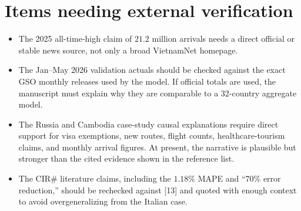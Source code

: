 \documentclass[11pt]{article}
\begin{document}
\section*{Items needing external verification}

\begin{itemize}
\item The 2025 all-time-high claim of \(21.2\) million arrivals needs a direct official or stable news source, not only a broad VietnamNet homepage.
\item The Jan--May 2026 validation actuals should be checked against the exact GSO monthly releases used by the model. If official totals are used, the manuscript must explain why they are comparable to a 32-country aggregate model.
\item The Russia and Cambodia case-study causal explanations require direct support for visa exemptions, new routes, flight counts, healthcare-tourism claims, and monthly arrival figures. At present, the narrative is plausible but stronger than the cited evidence shown in the reference list.
\item The CIR\# literature claims, including the \(1.18\%\) MAPE and ``70\% error reduction,'' should be rechecked against [13] and quoted with enough context to avoid overgeneralizing from the Italian case.
\end{itemize}
\end{document}
